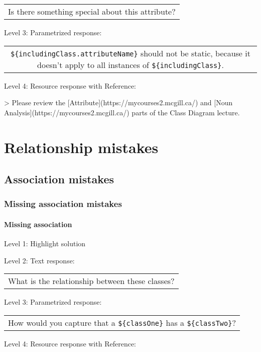 \begin{tabular}{|c}
Is there something special about this attribute?
\end{tabular} \medskip

\noindent Level 3: Parametrized response: \medskip

\begin{tabular}{|c}
\verb|${includingClass.attributeName}| should not be static, because it doesn't apply to all instances of \verb|${includingClass}|.
\end{tabular} \medskip

\noindent Level 4: Resource response with Reference:

> Please review the [Attribute](https://mycourses2.mcgill.ca/) and [Noun Analysis](https://mycourses2.mcgill.ca/) parts of the Class Diagram lecture.



\section{Relationship mistakes}

\subsection{Association mistakes}

\subsubsection{Missing association mistakes}

\paragraph{Missing association}

\noindent Level 1: Highlight solution \medskip

\noindent Level 2: Text response: \medskip

\begin{tabular}{|c}
What is the relationship between these classes?
\end{tabular} \medskip

\noindent Level 3: Parametrized response: \medskip

\begin{tabular}{|c}
How would you capture that a \verb|${classOne}| has a \verb|${classTwo}|?
\end{tabular} \medskip

\noindent Level 4: Resource response with Reference:


